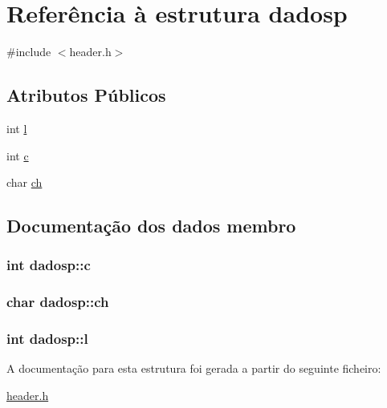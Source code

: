 \hypertarget{structdadosp}{\section{Referência à estrutura dadosp}
\label{structdadosp}
}


{\ttfamily \#include $<$header.\-h$>$}

\subsection*{Atributos Públicos}
\begin{DoxyCompactItemize}
\item 
int \hyperlink{structdadosp_afdcec30f68f5df59dc64ad1ac705bce4}{l}
\item 
int \hyperlink{structdadosp_a22329b86bae357b8d0cd797037d91573}{c}
\item 
char \hyperlink{structdadosp_a78a74cad25b2e1c3b7bce91109b6bf29}{ch}
\end{DoxyCompactItemize}


\subsection{Documentação dos dados membro}
\hypertarget{structdadosp_a22329b86bae357b8d0cd797037d91573}{
\subsubsection[{c}]{\setlength{\rightskip}{0pt plus 5cm}int dadosp\-::c}}\label{structdadosp_a22329b86bae357b8d0cd797037d91573}
\hypertarget{structdadosp_a78a74cad25b2e1c3b7bce91109b6bf29}{
\subsubsection[{ch}]{\setlength{\rightskip}{0pt plus 5cm}char dadosp\-::ch}}\label{structdadosp_a78a74cad25b2e1c3b7bce91109b6bf29}
\hypertarget{structdadosp_afdcec30f68f5df59dc64ad1ac705bce4}{
\subsubsection[{l}]{\setlength{\rightskip}{0pt plus 5cm}int dadosp\-::l}}\label{structdadosp_afdcec30f68f5df59dc64ad1ac705bce4}


A documentação para esta estrutura foi gerada a partir do seguinte ficheiro\-:\begin{DoxyCompactItemize}
\item 
\hyperlink{header_8h}{header.\-h}\end{DoxyCompactItemize}
